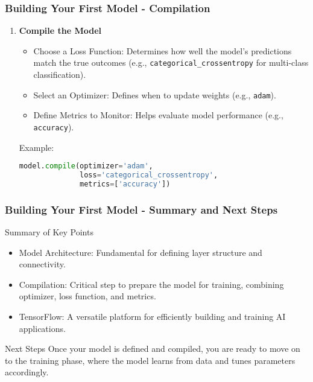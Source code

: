 \documentclass[aspectratio=169]{beamer}
\begin{document}
\begin{frame}[fragile]
    \frametitle{Building Your First Model - Compilation}
    \begin{enumerate}[resume]
        \item \textbf{Compile the Model}
        \begin{itemize}
            \item Choose a Loss Function: Determines how well the model's predictions match the true outcomes (e.g., \texttt{categorical\_crossentropy} for multi-class classification).
            \item Select an Optimizer: Defines when to update weights (e.g., \texttt{adam}).
            \item Define Metrics to Monitor: Helps evaluate model performance (e.g., \texttt{accuracy}).
        \end{itemize}
        Example:
        \begin{lstlisting}[language=Python]
model.compile(optimizer='adam',
              loss='categorical_crossentropy',
              metrics=['accuracy'])
        \end{lstlisting}
    \end{enumerate}
\end{frame}

\begin{frame}[fragile]
    \frametitle{Building Your First Model - Summary and Next Steps}
    \begin{block}{Summary of Key Points}
        \begin{itemize}
            \item Model Architecture: Fundamental for defining layer structure and connectivity.
            \item Compilation: Critical step to prepare the model for training, combining optimizer, loss function, and metrics.
            \item TensorFlow: A versatile platform for efficiently building and training AI applications.
        \end{itemize}
    \end{block}

    \begin{block}{Next Steps}
        Once your model is defined and compiled, you are ready to move on to the training phase, where the model learns from data and tunes parameters accordingly.
    \end{block}
\end{frame}
\end{document}
